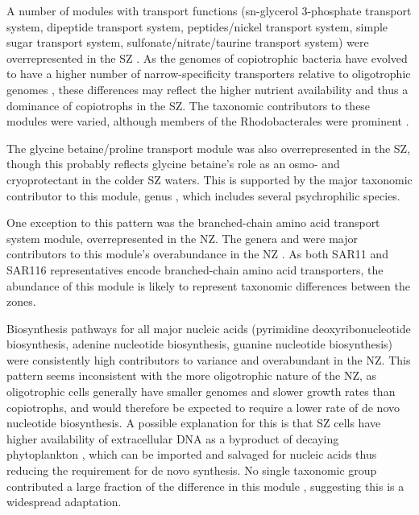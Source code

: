 A number of modules with transport functions (sn-glycerol 3-phosphate transport system, dipeptide transport system, peptides/nickel transport system, simple sugar transport system, sulfonate/nitrate/taurine transport system) were overrepresented in the \ac{SZ} .
As the genomes of copiotrophic bacteria have evolved to have a higher number of narrow-specificity transporters relative to oligotrophic genomes \cite{Lauro:2009gx}, these differences may reflect the higher nutrient availability and thus a dominance of copiotrophs in the \ac{SZ}.
The taxonomic contributors to these modules were varied, although members of the Rhodobacterales were prominent .



The glycine betaine/proline transport module was also overrepresented in the \ac{SZ}, though this probably reflects glycine betaine's role as an osmo- and cryoprotectant in the colder \ac{SZ} waters.
This is supported by the major taxonomic contributor to this module, genus , which includes several psychrophilic species. 

One exception to this pattern was the branched-chain amino acid transport system module, overrepresented in the \ac{NZ}. 
The genera  and  were major contributors to this module's overabundance in the \ac{NZ} .
As both SAR11 \cite{Giovannoni:2005ib} and SAR116 \cite{Grote:2011dm} representatives encode branched-chain amino acid transporters, the abundance of this module is likely to represent taxonomic differences between the zones.

Biosynthesis pathways for all major nucleic acids (pyrimidine deoxyribonucleotide biosynthesis, adenine nucleotide biosynthesis, guanine nucleotide biosynthesis) were consistently high contributors to variance and overabundant in the \ac{NZ}.
This pattern seems inconsistent with the more oligotrophic nature of the \ac{NZ}, as oligotrophic cells generally have smaller genomes \cite{Lauro:2009gx} and slower growth rates than copiotrophs, and would therefore be expected to require a lower rate of de novo nucleotide biosynthesis.
A possible explanation for this is that \ac{SZ} cells have higher availability of extracellular DNA as a byproduct of decaying phytoplankton \cite{Lomas:2011bp}, which can be imported and salvaged for nucleic acids \cite{Paul:1988wn} thus reducing the requirement for de novo synthesis.
No single taxonomic group contributed a large fraction of the difference in this module , suggesting this is a widespread adaptation.


